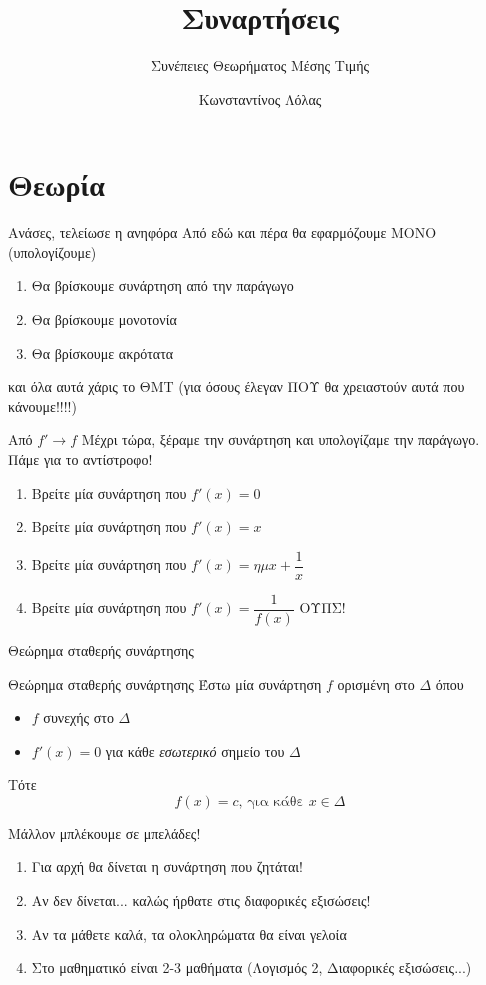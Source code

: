 \documentclass{presentation}
\title{Συναρτήσεις}
\subtitle{Συνέπειες Θεωρήματος Μέσης Τιμής}
\author[Λόλας]{Κωνσταντίνος Λόλας}
\institute[$10^ο$ ΓΕΛ]{$10^ο$ ΓΕΛ Θεσσαλονίκης}
\date{}
\begin{document}
\begin{frame}
  \titlepage
\end{frame}

\section{Θεωρία}
\begin{frame}{Ανάσες, τελείωσε η ανηφόρα}
  Από εδώ και πέρα θα εφαρμόζουμε ΜΟΝΟ (υπολογίζουμε)
  \begin{enumerate}
    \item<1-> Θα βρίσκουμε συνάρτηση από την παράγωγο
    \item<2-> Θα βρίσκουμε μονοτονία
    \item<3-> Θα βρίσκουμε ακρότατα
  \end{enumerate}
   και όλα αυτά χάρις το ΘΜΤ (για όσους έλεγαν ΠΟΥ θα χρειαστούν αυτά που κάνουμε!!!!)
\end{frame}

\begin{frame}{Από $f'\to f$}
  Μέχρι τώρα, ξέραμε την συνάρτηση και υπολογίζαμε την παράγωγο. Πάμε για το αντίστροφο!
  \begin{enumerate}
    \item<1-> Βρείτε μία συνάρτηση που $f'(x)=0$
    \item<2-> Βρείτε μία συνάρτηση που $f'(x)=x$
    \item<3-> Βρείτε μία συνάρτηση που $f'(x)=ημx+\dfrac{1}{x}$
    \item<4-> Βρείτε μία συνάρτηση που $f'(x)=\dfrac{1}{f(x)}$ ΟΥΠΣ!
  \end{enumerate}
\end{frame}

\begin{frame}{Θεώρημα σταθερής συνάρτησης}
  \begin{block}{Θεώρημα σταθερής συνάρτησης}
    Έστω μία συνάρτηση $f$ ορισμένη στο $Δ$ όπου
    \begin{itemize}
      \item $f$ συνεχής στο $Δ$
      \item $f'(x)=0$ για κάθε \emph{εσωτερικό} σημείο του $Δ$
    \end{itemize}
    Τότε
    $$f(x)=c \text{, για κάθε } x\in Δ$$
  \end{block}
\end{frame}

\begin{frame}{Μάλλον μπλέκουμε σε μπελάδες!}
  \begin{enumerate}
    \item<1-> Για αρχή θα δίνεται η συνάρτηση που ζητάται!
    \item<2-> Αν δεν δίνεται... καλώς ήρθατε στις διαφορικές εξισώσεις!
    \item<3-> Αν τα μάθετε καλά, τα ολοκληρώματα θα είναι γελοία
    \item<4-> Στο μαθηματικό είναι 2-3 μαθήματα (Λογισμός 2, Διαφορικές εξισώσεις...)
  \end{enumerate}
\end{frame}
\end{document}
